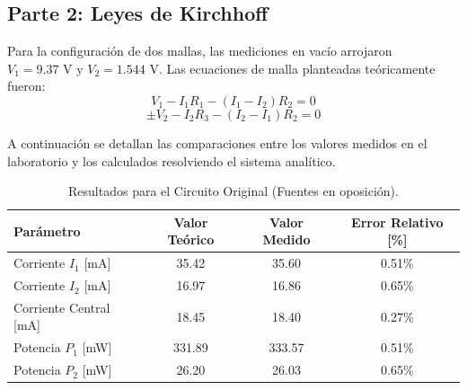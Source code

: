 \documentclass[11pt]{article}
\begin{document}
\subsection{Parte 2: Leyes de Kirchhoff}

Para la configuración de dos mallas, las mediciones en vacío arrojaron $V_1 = 9.37\text{ V}$ y $V_2 = 1.544\text{ V}$. Las ecuaciones de malla planteadas teóricamente fueron:
\begin{equation}
    V_1 - I_1 R_1 - (I_1 - I_2) R_2 = 0
\end{equation}
\begin{equation}
    \pm V_2 - I_2 R_3 - (I_2 - I_1) R_2 = 0
\end{equation}

A continuación se detallan las comparaciones entre los valores medidos en el laboratorio y los calculados resolviendo el sistema analítico.

\begin{table}[H]
    \centering
    \begin{tabular}{l|ccc}
        \toprule
        \textbf{Parámetro} & \textbf{Valor Teórico} & \textbf{Valor Medido} & \textbf{Error Relativo [\%]} \\ 
        \midrule
        Corriente $I_1$ [mA]    & 35.42                       & 35.60                      & 0.51\%                     \\ 
        Corriente $I_2$ [mA]    & 16.97                       & 16.86                      & 0.65\%                     \\ 
        Corriente Central [mA]  & 18.45                       & 18.40                      & 0.27\%                     \\ 
        \midrule
        Potencia $P_1$ [mW]     & 331.89                      & 333.57                     & 0.51\%                     \\
        Potencia $P_2$ [mW]     & 26.20                       & 26.03                      & 0.65\%                     \\
        \bottomrule
    \end{tabular}
    \caption{Resultados para el Circuito Original (Fuentes en oposición).}
    \label{tab:kirchhoff_1}
\end{table}
\end{document}
